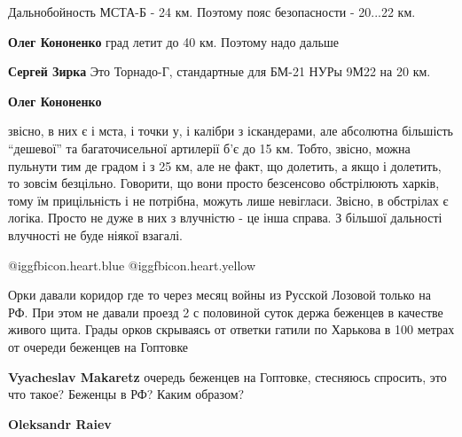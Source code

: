  
 
 
 
 
\zzSecCmt

\begin{itemize} %

Дальнобойность МСТА-Б - 24 км. Поэтому пояс безопасности - 20...22 км.

\begin{itemize} %
\textbf{Олег Кононенко} град летит до 40 км. Поэтому надо дальше

\textbf{Сергей Зирка} Это Торнадо-Г, стандартные для БМ-21 НУРы 9М22 на 20 км.

\textbf{Олег Кононенко} 

звісно, в них є і мста, і точки у, і калібри з іскандерами, але абсолютна
більшість \enquote{дешевої} та багаточисельної артилерії б'є до 15 км. Тобто, звісно,
можна пульнути тим де градом і з 25 км, але не факт, що долетить, а якщо і
долетить, то зовсім безцільно. Говорити, що вони просто безсенсово обстрілюють
харків, тому їм прицільність і не потрібна, можуть лише невігласи. Звісно, в
обстрілах є логіка. Просто не дуже в них з влучністю - це інша справа. З
більшої дальності влучності не буде ніякої взагалі.

\end{itemize} %

 @igg{fbicon.heart.blue}  @igg{fbicon.heart.yellow} 


Орки давали коридор где то через месяц войны из Русской Лозовой только на РФ.
При этом не давали проезд 2 с половиной суток держа беженцев в качестве живого
щита. Грады орков скрываясь от ответки гатили по Харькова в 100 метрах от
очереди беженцев на Гоптовке

\begin{itemize} %
\textbf{Vyacheslav Makaretz} очередь беженцев на Гоптовке, стесняюсь спросить, это что такое? Беженцы в РФ? Каким образом?

\textbf{Oleksandr Raiev} 


\end{itemize}
\end{itemize}
